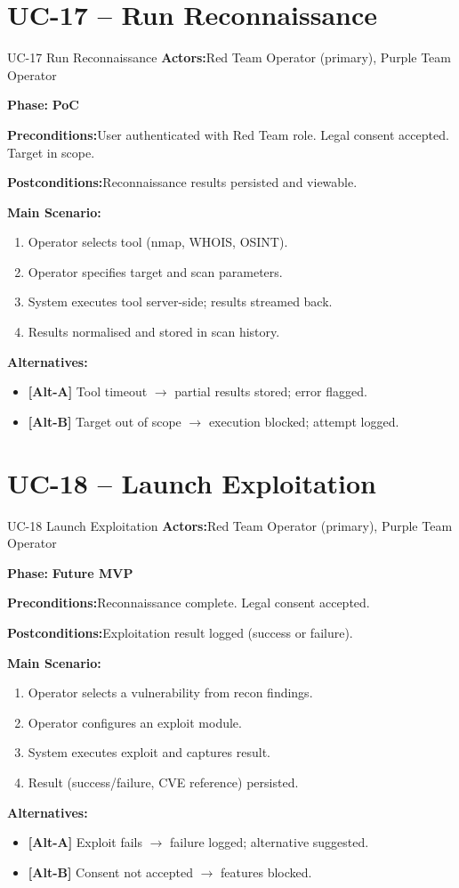 \documentclass[12pt,a4paper]{report}
\newcommand{\ucfield}[2]{%
    \noindent\textbf{\color{helixpurplemid}#1:}\quad #2\par\medskip
}
\newcommand{\ucphase}[1]{%
    \noindent\textbf{\color{helixpurplemid}Phase:}\quad%
    \ifstrequal{#1}{PoC}{\textcolor{helixteal}{\textbf{PoC}}}{\textcolor{helixamber}{\textbf{Future MVP}}}%
    \par\medskip
}
\begin{document}
\section{UC-17 -- Run Reconnaissance}
\begin{ucbox}{UC-17 \quad Run Reconnaissance}
    \ucfield{Actors}{Red Team Operator (primary), Purple Team Operator}
    \ucphase{PoC}
    \ucfield{Preconditions}{User authenticated with Red Team role. Legal consent accepted. Target in scope.}
    \ucfield{Postconditions}{Reconnaissance results persisted and viewable.}
    \textbf{\color{helixpurplemid}Main Scenario:}
    \begin{enumerate}
        \item Operator selects tool (nmap, WHOIS, OSINT).
        \item Operator specifies target and scan parameters.
        \item System executes tool server-side; results streamed back.
        \item Results normalised and stored in scan history.
    \end{enumerate}
    \textbf{\color{helixpurplemid}Alternatives:}
    \begin{itemize}
        \item \textbf{[Alt-A]} Tool timeout $\rightarrow$ partial results stored; error flagged.
        \item \textbf{[Alt-B]} Target out of scope $\rightarrow$ execution blocked; attempt logged.
    \end{itemize}
\end{ucbox}

\section{UC-18 -- Launch Exploitation}
\begin{ucbox}{UC-18 \quad Launch Exploitation}
    \ucfield{Actors}{Red Team Operator (primary), Purple Team Operator}
    \ucphase{Future MVP}
    \ucfield{Preconditions}{Reconnaissance complete. Legal consent accepted.}
    \ucfield{Postconditions}{Exploitation result logged (success or failure).}
    \textbf{\color{helixpurplemid}Main Scenario:}
    \begin{enumerate}
        \item Operator selects a vulnerability from recon findings.
        \item Operator configures an exploit module.
        \item System executes exploit and captures result.
        \item Result (success/failure, CVE reference) persisted.
    \end{enumerate}
    \textbf{\color{helixpurplemid}Alternatives:}
    \begin{itemize}
        \item \textbf{[Alt-A]} Exploit fails $\rightarrow$ failure logged; alternative suggested.
        \item \textbf{[Alt-B]} Consent not accepted $\rightarrow$ features blocked.
    \end{itemize}
\end{ucbox}
\end{document}
